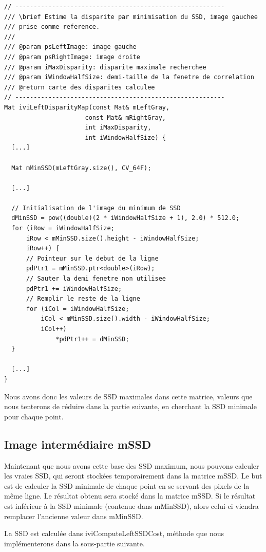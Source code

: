 \documentclass[a4paper]{article}
\begin{document}
\begin{lstlisting}
// ---------------------------------------------------------
/// \brief Estime la disparite par minimisation du SSD, image gauchee
/// prise comme reference.
///
/// @param psLeftImage: image gauche
/// @param psRightImage: image droite
/// @param iMaxDisparity: disparite maximale recherchee
/// @param iWindowHalfSize: demi-taille de la fenetre de correlation
/// @return carte des disparites calculee
// ---------------------------------------------------------
Mat iviLeftDisparityMap(const Mat& mLeftGray,
                      const Mat& mRightGray,
                      int iMaxDisparity,
                      int iWindowHalfSize) {
  [...]

  Mat mMinSSD(mLeftGray.size(), CV_64F);

  [...]

  // Initialisation de l'image du minimum de SSD
  dMinSSD = pow((double)(2 * iWindowHalfSize + 1), 2.0) * 512.0;
  for (iRow = iWindowHalfSize;
      iRow < mMinSSD.size().height - iWindowHalfSize;
      iRow++) {
      // Pointeur sur le debut de la ligne
      pdPtr1 = mMinSSD.ptr<double>(iRow);
      // Sauter la demi fenetre non utilisee
      pdPtr1 += iWindowHalfSize;
      // Remplir le reste de la ligne
      for (iCol = iWindowHalfSize;
          iCol < mMinSSD.size().width - iWindowHalfSize;
          iCol++)
              *pdPtr1++ = dMinSSD;
  }

  [...]
}
\end{lstlisting}

Nous avons donc les valeurs de SSD maximales dans cette matrice, valeurs que nous tenterons de réduire dans la partie suivante, en cherchant la SSD minimale pour chaque point.

\clearpage
\subsection{Image intermédiaire mSSD}
Maintenant que nous avons cette base des SSD maximum, nous pouvons calculer les vraies SSD, qui seront stockées temporairement dans la matrice mSSD.
Le but est de calculer la SSD minimale de chaque point en se servant des pixels de la même ligne. Le résultat obtenu sera stocké dans la matrice mSSD. Si le résultat est inférieur à la SSD minimale (contenue dans mMinSSD), alors celui-ci viendra remplacer l'ancienne valeur dans mMinSSD.

La SSD est calculée dans iviComputeLeftSSDCost, méthode que nous implémenterons dans la sous-partie suivante.
\end{document}
